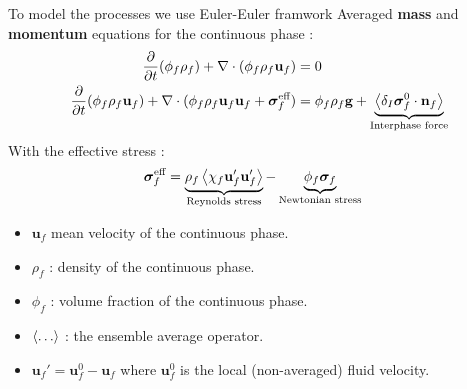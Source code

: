 \documentclass{sintefbeamer}
\begin{document}
\begin{frame}{To model the processes we use Euler-Euler framwork }
  Averaged \textbf{mass} and \textbf{momentum} equations for the continuous phase :
\begin{align*}
  \frac{\partial}{\partial t} (\phi_f \rho_f)  
  + \mathbf{\nabla}\cdot (\phi_f \rho_f\textbf{u}_f)
  &= 
  0\\
  \frac{\partial}{\partial t} (\phi_f \rho_f\textbf{u}_f)  
  + \mathbf{\nabla}\cdot (
      \phi_f \rho_f\textbf{u}_f\textbf{u}_f
      + \bm{\sigma}_f^\text{eff}
  )
  &= 
  \phi_f  \rho_f \textbf{g}
  + 
  \underbrace{
    \left<\delta_I \bm{\sigma}_f^0 \cdot \textbf{n}_f\right>
  }_\text{Interphase force}
\end{align*}
With the effective stress : 
\begin{align*}
  &\bm{\sigma}_f^\text{eff}
  = 
   \underbrace{\rho_f\left<\chi_f \textbf{u}_f'\textbf{u}_f'\right>}_\text{Reynolds stress}
    - \underbrace{\phi_f \bm{\sigma}_f}_\text{Newtonian stress}
\end{align*}
\begin{itemize}
  \item $\textbf{u}_f$ mean velocity of the continuous phase.  
  \item $\rho_f$ : density of the continuous phase. 
  \item $\phi_f$ : volume fraction of the continuous phase. 
  \item $\left<\ldots\right>$ : the ensemble average operator. 
  \item $\textbf{u}_f' = \textbf{u}^0_f - \textbf{u}_f$ where $\textbf{u}_f^0$ is the local (non-averaged) fluid velocity. 
\end{itemize}
\end{frame}
\end{document}
